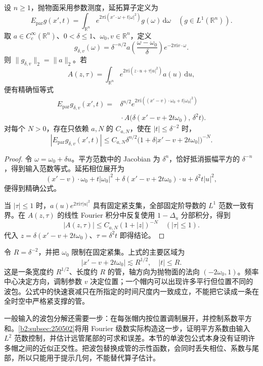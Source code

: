 \begin{proposition}[抛物面的单波包模型]\label{b2:prop:23-parabolic-packet}
设 \(n\geq1\)，抛物面采用参数测度，延拓算子定义为
\[
 E_{\mathrm{par}}g(x',t)
 =\int_{\mathbb R^n}e^{2\pi\mathrm i(x'\cdot\omega+t|\omega|^2)}
      g(\omega)\,\mathrm d\omega
 \quad(g\in L^1(\mathbb R^n)).
\]
取 \(a\in C_c^\infty(\mathbb R^n)\)、\(0<\delta\leq1\)、\(\omega_0,v\in\mathbb R^n\)，定义
\[
 g_{\delta,v}(\omega)
 =\delta^{-n/2}
   a\!\left(\frac{\omega-\omega_0}{\delta}\right)
   e^{-2\pi\mathrm i v\cdot\omega}.
\]
则 \(\|g_{\delta,v}\|_2=\|a\|_2\)。若
\[
 A(z,\tau)=\int_{\mathbb R^n}
       e^{2\pi\mathrm i(z\cdot u+\tau|u|^2)}a(u)\,\mathrm du,
\]
便有精确恒等式
\[
 \begin{aligned}
 E_{\mathrm{par}}g_{\delta,v}(x',t)
 ={}&\delta^{n/2}
 e^{2\pi\mathrm i((x'-v)\cdot\omega_0+t|\omega_0|^2)}\\
 &{}\cdot
 A\bigl(\delta(x'-v+2t\omega_0),\,\delta^2t\bigr).
 \end{aligned}
\]
对每个 \(N>0\)，存在只依赖 \(a,N\) 的 \(C_{a,N}\)，使在 \(|t|\leq\delta^{-2}\) 时，
\[
 |E_{\mathrm{par}}g_{\delta,v}(x',t)|
 \leq C_{a,N}\delta^{n/2}
       \bigl(1+\delta|x'-v+2t\omega_0|\bigr)^{-N}.
\]
\end{proposition}
\begin{proof}
令 \(\omega=\omega_0+\delta u\)。平方范数中的 Jacobian 为 \(\delta^n\)，恰好抵消振幅平方的 \(\delta^{-n}\)，得到输入范数等式。延拓相位展开为
\[
 (x'-v)\cdot\omega_0+t|\omega_0|^2
 +\delta(x'-v+2t\omega_0)\cdot u+\delta^2t|u|^2,
\]
便得到精确公式。

当 \(|\tau|\leq1\) 时，\(a(u)e^{2\pi\mathrm i\tau|u|^2}\) 具有固定紧支集，全部固定阶导数的 \(L^1\) 范数一致有界。在 \(A(z,\tau)\) 的线性 Fourier 积分中反复使用 \(1-\Delta_u\) 分部积分，得到
\[
 |A(z,\tau)|\leq C_{a,N}(1+|z|)^{-N}
 \quad(|\tau|\leq1).
\]
代入 \(z=\delta(x'-v+2t\omega_0)\)、\(\tau=\delta^2t\) 即得结论。
\end{proof}

令 \(R=\delta^{-2}\)，并把 \(\omega_0\) 限制在固定紧集。上式的主要区域为
\[
 |x'-v+2t\omega_0|\lesssim R^{1/2},\quad |t|\leq R.
\]
这是一条宽度约 \(R^{1/2}\)、长度约 \(R\) 的管，轴方向为抛物面的法向 \((-2\omega_0,1)\)。频率中心决定方向，调制参数 \(v\) 决定位置；一个帽内可以出现许多平行但位置不同的波包。公式中的快速衰减只在所指定的时间尺度内一致成立，不能把它读成一条在全时空中严格紧支撑的管。

\ProseParagraphBreak
一般输入的波包分解还需要一步：在每张帽内按位置调制展开，并控制系数平方和。\cref{b2:subsec:250502}将用 Fourier 级数实际构造这一步，证明平方系数由输入 \(L^2\) 范数控制，并估计远管尾部的可求和误差。本节的单波包公式本身没有证明许多帽之间的近似正交性。把波包替换成管的示性函数，会同时丢失相位、系数与尾部，所以只能用于提示几何，不能替代算子估计。


